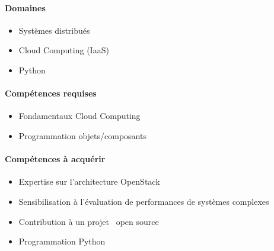 \documentclass[a4paper,11pt]{article}
\begin{document}
%

\begin{note}


\paragraph*{Domaines}

\begin{itemize}
 \item Systèmes distribués
 \item Cloud Computing (IaaS)
 \item Python
\end{itemize}

\paragraph*{Compétences requises}

\begin{itemize}
 \item Fondamentaux Cloud Computing
 \item Programmation objets/composants
\end{itemize}

\paragraph*{Compétences à acquérir}

\begin{itemize}
\item Expertise sur l'architecture OpenStack
\item Sensibilisation à l'évaluation de performances de systèmes complexes
\item Contribution à un projet \og~open source~\fg
\item Programmation Python
\end{itemize}


\end{note}
\end{document}
